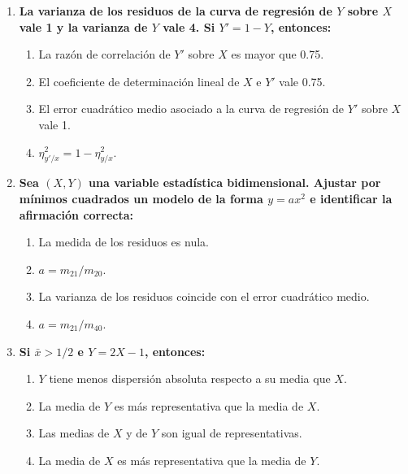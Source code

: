 \documentclass[fleqn]{article}
\begin{document}
\begin{enumerate}
\begin{enumerate}
                                 \item \textbf{La varianza de los residuos de la curva de regresión de $Y$ sobre $X$ vale 1 y la varianza de $Y$ vale 4.
                                        Si $Y' = 1-Y$, entonces:}  
                                        \begin{enumerate}
                                                \item La razón de correlación de $Y'$ sobre $X$ es mayor que 0.75.
                                                \item El coeficiente de determinación lineal de $X$ e $Y'$ vale 0.75.
                                                \item El error cuadrático medio asociado a la curva de regresión de $Y'$ sobre $X$ vale 1.
                                                \item $\eta_{y'/x}^2 = 1 - \eta_{y/x}^2$.
                                        \end{enumerate} 

                                \item \textbf{Sea $(X,Y)$ una variable estadística bidimensional. Ajustar por mínimos cuadrados un modelo de la forma 
                                        $y= ax^2$ e identificar la afirmación correcta:}
                                        \begin{enumerate}
                                                \item La medida de los residuos es nula.
                                                \item $a= m_{21} / m_{20}$.
                                                \item La varianza de los residuos coincide con el error cuadrático medio.
                                                \item $a= m_{21} / m_{40}$.
                                        \end{enumerate}

                                \item \textbf{Si $\bar{x} > 1/2$ e $Y = 2X -1$, entonces:}
                                        \begin{enumerate}
                                                \item $Y$ tiene menos dispersión absoluta respecto a su media que $X$.
                                                \item La media de $Y$ es más representativa que la media de $X$.
                                                \item Las medias de $X$ y de $Y$ son igual de representativas.
                                                \item La media de $X$ es más representativa que la media de $Y$.
                                        \end{enumerate} 
                                

\end{enumerate}
\end{enumerate}
\end{document}
